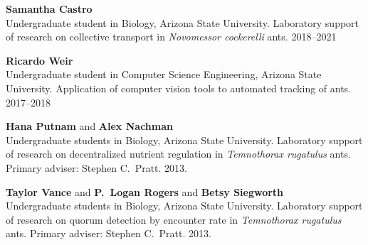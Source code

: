 \documentclass[10pt]{article}           %
\begin{document}
\begin{outerlist}


    \item \textbf{Samantha Castro}\\
        Undergraduate student in Biology, Arizona State University.
        Laboratory support of research on collective transport in
        \emph{Novomessor cockerelli} ants.
        2018--2021

    \item \textbf{Ricardo Weir}\\
        Undergraduate student in Computer Science Engineering, Arizona State University.
        Application of computer vision tools to automated tracking of
        ants.
        2017--2018

    \item \textbf{Hana Putnam} and \textbf{Alex Nachman}\\
        Undergraduate students in Biology, Arizona State University.
        Laboratory support of research on decentralized nutrient
        regulation in \emph{Temnothorax rugatulus} ants.
        Primary adviser: Stephen C.~Pratt.
        2013.

    \item \textbf{Taylor Vance} and \textbf{P.~Logan Rogers}
        and \textbf{Betsy Siegworth}\\
        Undergraduate students in Biology, Arizona State University.
        Laboratory support of research on quorum detection by encounter
        rate in \emph{Temnothorax rugatulus} ants.
        Primary adviser: Stephen C.~Pratt.
        2013.





\end{outerlist}
\end{document}
